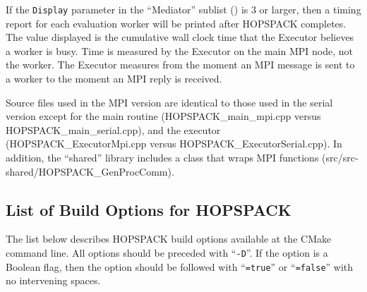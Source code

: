 If the {\tt Display} parameter in the ``Mediator'' sublist
() is 3 or larger,
then a timing report for each evaluation worker will be printed after
HOPSPACK completes.  The value displayed is the cumulative wall clock time that
the Executor believes a worker is busy.  Time is measured by the Executor on
the main MPI node, not the worker.  The Executor measures from the moment
an MPI message is sent to a worker to the moment an MPI reply is received.

Source files used in the MPI version are identical to those used
in the serial version except for the main routine
({\sf HOPSPACK\_main\_mpi.cpp} versus {\sf HOPSPACK\_main\_serial.cpp}),
and the executor
({\sf HOPSPACK\_ExecutorMpi.cpp} versus
{\sf HOPSPACK\_ExecutorSerial.cpp}).
In addition, the ``shared'' library includes a class that wraps MPI
functions ({\sf src/src-shared/HOPSPACK\_GenProcComm}).


\subsection{List of Build Options for HOPSPACK}
\label{subinstall:ED}

The list below describes HOPSPACK build options available at the CMake
command line.  All options should be preceded with ``{\tt -D}''.
If the option is a Boolean flag, then the option should be followed
with ``{\tt =true}'' or ``{\tt =false}'' with no intervening spaces.

